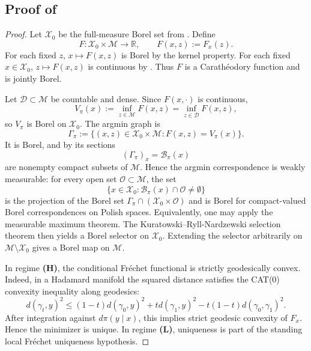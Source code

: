 \documentclass[10pt]{article} %
\theoremstyle{definition}
\providecommand{\R}{\mathbb{R}}
\providecommand{\1}{\mathbf{1}}
\providecommand{\sM}{\mathcal{M}}
\providecommand{\sX}{\mathcal{X}}
\providecommand{\sD}{\mathcal{D}}
\providecommand{\sO}{\mathcal{O}}
\begin{document}
\subsection{Proof of }
\begin{proof}
Let $\sX_0$ be the full-measure Borel set from . Define
\[
F:\sX_0\times\sM\to\R,
\qquad
F(x,z):=F_x(z).
\]
For each fixed $z$, $x\mapsto F(x,z)$ is Borel by the kernel property. For each fixed $x\in \sX_0$, $z\mapsto F(x,z)$ is continuous by . Thus $F$ is a Carath\'eodory function and is jointly Borel.

Let $\sD\subset\sM$ be countable and dense. Since $F(x,\cdot)$ is continuous,
\[
V_\pi(x):=\inf_{z\in\sM}F(x,z)=\inf_{z\in\sD}F(x,z),
\]
so $V_\pi$ is Borel on $\sX_0$. The argmin graph is
\[
\Gamma_\pi:=\{(x,z)\in \sX_0\times\sM:F(x,z)=V_\pi(x)\}.
\]
It is Borel, and by  its sections
\[
(\Gamma_\pi)_x=\mathcal B_\pi(x)
\]
are nonempty compact subsets of $\sM$. Hence the argmin correspondence is weakly measurable: for every open set $\sO\subset\sM$, the set
\[
\{x\in \sX_0:\mathcal B_\pi(x)\cap \sO\neq\emptyset\}
\]
is the projection of the Borel set $\Gamma_\pi\cap (\sX_0\times \sO)$ and is Borel for compact-valued Borel correspondences on Polish spaces. Equivalently, one may apply the measurable maximum theorem. The Kuratowski--Ryll-Nardzewski selection theorem then yields a Borel selector on $\sX_0$. Extending the selector arbitrarily on $\sM\setminus \sX_0$ gives a Borel map on $\sM$.

In regime \textbf{(H)}, the conditional Fr\'echet functional is strictly geodesically convex. Indeed, in a Hadamard manifold the squared distance satisfies the CAT(0) convexity inequality along geodesics:
\[
d(\gamma_t,y)^2
\le (1-t)d(\gamma_0,y)^2+t d(\gamma_1,y)^2-t(1-t)d(\gamma_0,\gamma_1)^2.
\]
After integration against $d\pi(y\mid x)$, this implies strict geodesic convexity of $F_x$. Hence the minimizer is unique. In regime \textbf{(L)}, uniqueness is part of the standing local Fr\'echet uniqueness hypothesis.
\end{proof}
\end{document}
